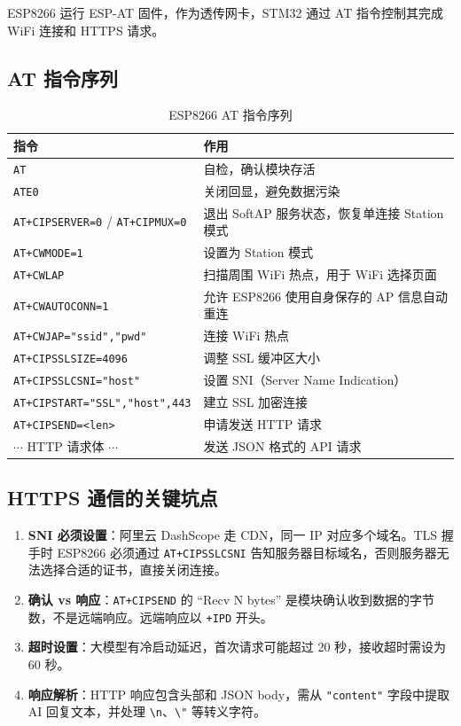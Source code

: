 \documentclass[12pt,a4paper]{ctexart}
\begin{document}
ESP8266 运行 ESP-AT 固件，作为透传网卡，STM32 通过 AT 指令控制其完成 WiFi 连接和 HTTPS 请求。

\subsection{AT 指令序列}

\begin{table}[H]
\centering
\begin{tabularx}{\textwidth}{lX}
\toprule
\textbf{指令} & \textbf{作用} \\
\midrule
\texttt{AT}               & 自检，确认模块存活 \\
\texttt{ATE0}             & 关闭回显，避免数据污染 \\
\texttt{AT+CIPSERVER=0} / \texttt{AT+CIPMUX=0} & 退出 SoftAP 服务状态，恢复单连接 Station 模式 \\
\texttt{AT+CWMODE=1}      & 设置为 Station 模式 \\
\texttt{AT+CWLAP}         & 扫描周围 WiFi 热点，用于 WiFi 选择页面 \\
\texttt{AT+CWAUTOCONN=1}  & 允许 ESP8266 使用自身保存的 AP 信息自动重连 \\
\texttt{AT+CWJAP="ssid","pwd"} & 连接 WiFi 热点 \\
\texttt{AT+CIPSSLSIZE=4096}    & 调整 SSL 缓冲区大小 \\
\texttt{AT+CIPSSLCSNI="host"}  & 设置 SNI（Server Name Indication） \\
\texttt{AT+CIPSTART="SSL","host",443} & 建立 SSL 加密连接 \\
\texttt{AT+CIPSEND=<len>} & 申请发送 HTTP 请求 \\
$\cdots$ HTTP 请求体 $\cdots$ & 发送 JSON 格式的 API 请求 \\
\bottomrule
\end{tabularx}
\caption{ESP8266 AT 指令序列}
\end{table}

\subsection{HTTPS 通信的关键坑点}

\begin{enumerate}
    \item \textbf{SNI 必须设置}：阿里云 DashScope 走 CDN，同一 IP 对应多个域名。TLS 握手时 ESP8266 必须通过 \texttt{AT+CIPSSLCSNI} 告知服务器目标域名，否则服务器无法选择合适的证书，直接关闭连接。
    \item \textbf{确认 vs 响应}：\texttt{AT+CIPSEND} 的 ``Recv N bytes'' 是模块确认收到数据的字节数，不是远端响应。远端响应以 \texttt{+IPD} 开头。
    \item \textbf{超时设置}：大模型有冷启动延迟，首次请求可能超过 20 秒，接收超时需设为 60 秒。
    \item \textbf{响应解析}：HTTP 响应包含头部和 JSON body，需从 \texttt{"content"} 字段中提取 AI 回复文本，并处理 \texttt{\textbackslash n}、\texttt{\textbackslash "} 等转义字符。
\end{enumerate}
\end{document}
